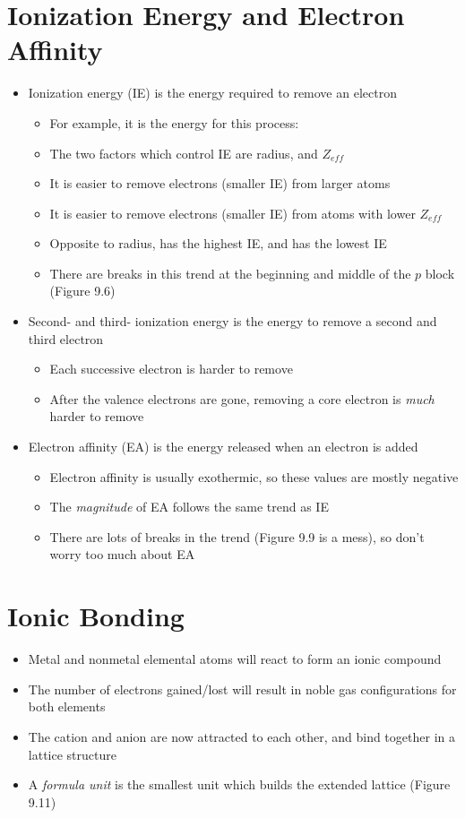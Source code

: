 \documentclass[12pt, openany, letterpaper]{memoir}
\begin{document}
\section{Ionization Energy and Electron Affinity}
\begin{itemize}
	\item Ionization energy (IE) is the energy required to remove an electron
	      \begin{itemize}
		      \item For example, it is the energy for this process: 
		      \item The two factors which control IE are radius, and $Z_{eff}$
		      \item It is easier to remove electrons (smaller IE) from larger atoms
		      \item It is easier to remove electrons (smaller IE) from atoms with lower $Z_{eff}$
		      \item Opposite to radius,  has the highest IE, and  has the lowest IE
		      \item There are breaks in this trend at the beginning and middle of the $p$ block (Figure 9.6)
	      \end{itemize}
	\item Second- and third- ionization energy is the energy to remove a second and third electron
	      \begin{itemize}
		      \item Each successive electron is harder to remove
		      \item After the valence electrons are gone, removing a core electron is \emph{much} harder to remove
	      \end{itemize}
	\item Electron affinity (EA) is the energy released when an electron is added
	      \begin{itemize}
		      \item Electron affinity is usually exothermic, so these values are mostly negative
		      \item The \emph{magnitude} of EA follows the same trend as IE
		      \item There are lots of breaks in the trend (Figure 9.9 is a mess), so don't worry too much about EA
	      \end{itemize}
\end{itemize}
\section{Ionic Bonding}
\begin{itemize}
	\item Metal and nonmetal elemental atoms will react to form an ionic compound
	\item The number of electrons gained/lost will result in noble gas configurations for both elements
	\item The cation and anion are now attracted to each other, and bind together in a lattice structure
	\item A \emph{formula unit} is the smallest unit which builds the extended lattice (Figure 9.11)
\end{itemize}
\end{document}
